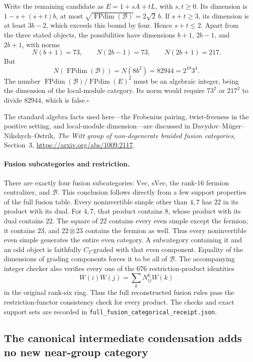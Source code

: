 Write the remaining candidate as $E=1+sA+tL$, with $s,t\geq0$.
Its dimension is $1-s+(s+t)b$, at most
$\sqrt{\operatorname{FPdim}(\mathcal B)}=2\sqrt2\,b$.
If $s+t\geq3$, its dimension is at least $3b-2$, which exceeds this
bound by four. Hence $s+t\leq2$. Apart from the three stated objects,
the possibilities have dimensions $b+1$, $2b-1$, and $2b+1$, with norms
\[
 N(b+1)=73,\qquad N(2b-1)=73,\qquad N(2b+1)=217.
\]
But
\[
 N(\operatorname{FPdim}(\mathcal B))=N(8b^2)
   =82944=2^{10}3^4.
\]
The number $\operatorname{FPdim}(\mathcal B)/\operatorname{FPdim}(E)^2$
must be an algebraic integer, being the dimension of the local-module
category. Its norm would require $73^2$ or $217^2$ to divide $82944$,
which is false.\hfill$\square$

The standard algebra facts used here---the Frobenius pairing,
twist-freeness in the positive setting, and local-module dimension---are
discussed in Davydov--M\"uger--Nikshych--Ostrik,
\emph{The Witt group of non-degenerate braided fusion categories},
Section~3, \url{https://arxiv.org/abs/1009.2117}.

\paragraph{Fusion subcategories and restriction.}
There are exactly four fusion subcategories: $\mathrm{Vec}$,
$\mathrm{sVec}$, the rank-$16$ fermion centralizer, and $\mathcal B$.
This conclusion follows directly from a few support properties of the
full fusion table. Every noninvertible simple other than $4,7$ has $22$
in its product with its dual. For $4,7$, that product contains $8$, whose
product with its dual contains $22$. The square of $22$ contains every
even simple except the fermion; it contains $23$, and $22\otimes23$
contains the fermion as well. Thus every noninvertible even simple
generates the entire even category. A subcategory containing it and an
odd object is faithfully $C_2$-graded with that even component. Equality
of the dimensions of grading components forces it to be all of
$\mathcal B$.
The accompanying integer checker also verifies every one of the $676$
restriction-product identities
\[
 W(i)W(j)=\sum_k N_{ij}^{k}W(k)
\]
in the original rank-six ring. Thus the full reconstructed fusion rules
pass the restriction-functor consistency check for every product. The checks and exact support sets are recorded
in \texttt{full\_fusion\_categorical\_receipt.json}.

\subsection{The canonical intermediate condensation adds no new
near-group category}

